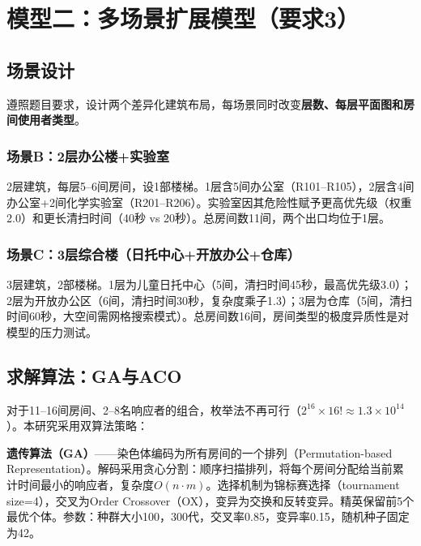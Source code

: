 \documentclass[12pt,a4paper]{ctexart}
\begin{document}
\section{模型二：多场景扩展模型（要求3）}

\subsection{场景设计}

遵照题目要求，设计两个差异化建筑布局，每场景同时改变\textbf{层数、每层平面图和房间使用者类型}。

\subsubsection{场景B：2层办公楼+实验室}

2层建筑，每层5--6间房间，设1部楼梯。1层含5间办公室（R101--R105），2层含4间办公室+2间化学实验室（R201--R206）。实验室因其危险性赋予更高优先级（权重2.0）和更长清扫时间（40秒 vs 20秒）。总房间数11间，两个出口均位于1层。

\subsubsection{场景C：3层综合楼（日托中心+开放办公+仓库）}

3层建筑，2部楼梯。1层为儿童日托中心（5间，清扫时间45秒，最高优先级3.0）；2层为开放办公区（6间，清扫时间30秒，复杂度乘子1.3）；3层为仓库（5间，清扫时间60秒，大空间需网格搜索模式）。总房间数16间，房间类型的极度异质性是对模型的压力测试。

\subsection{求解算法：GA与ACO}

对于11--16间房间、2--8名响应者的组合，枚举法不再可行（$2^{16}\times 16! \approx 1.3\times 10^{14}$）。本研究采用双算法策略：

\textbf{遗传算法（GA）}——染色体编码为所有房间的一个排列（Permutation-based Representation）。解码采用贪心分割：顺序扫描排列，将每个房间分配给当前累计时间最小的响应者，复杂度$O(n\cdot m)$。选择机制为锦标赛选择（tournament size=4），交叉为Order Crossover（OX），变异为交换和反转变异。精英保留前5个最优个体。参数：种群大小100，300代，交叉率0.85，变异率0.15，随机种子固定为42。
\end{document}
